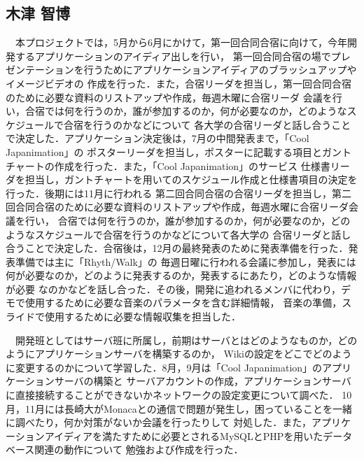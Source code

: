 \subsection{木津 智博}
\par
　本プロジェクトでは，5月から6月にかけて，第一回合同合宿に向けて，今年開発するアプリケーションのアイディア出しを行い，
第一回合同合宿の場でプレゼンテーションを行うためにアプリケーションアイディアのブラッシュアップやイメージビデオの
作成を行った．また，合宿リーダを担当し，第一回合同合宿のために必要な資料のリストアップや作成，毎週木曜に合宿リーダ
会議を行い，合宿では何を行うのか，誰が参加するのか，何が必要なのか，どのようなスケジュールで合宿を行うのかなどについて
各大学の合宿リーダと話し合うことで決定した．アプリケーション決定後は，7月の中間発表まで，「Cool Japanimation」の
ポスターリーダを担当し，ポスターに記載する項目とガントチャートの作成を行った．また，「Cool Japanimation」のサービス
仕様書リーダを担当し，ガントチャートを用いてのスケジュール作成と仕様書項目の決定を行った．後期には11月に行われる
第二回合同合宿の合宿リーダを担当し，第二回合同合宿のために必要な資料のリストアップや作成，毎週水曜に合宿リーダ会議を行い，
合宿では何を行うのか，誰が参加するのか，何が必要なのか，どのようなスケジュールで合宿を行うのかなどについて各大学の
合宿リーダと話し合うことで決定した．合宿後は，12月の最終発表のために発表準備を行った．発表準備では主に「Rhyth/Walk」の
毎週日曜に行われる会議に参加し，発表には何が必要なのか，どのように発表するのか，発表するにあたり，どのような情報が必要
なのかなどを話し合った．その後，開発に追われるメンバに代わり，デモで使用するために必要な音楽のパラメータを含む詳細情報，
音楽の準備，スライドで使用するために必要な情報収集を担当した．
\par
　開発班としてはサーバ班に所属し，前期はサーバとはどのようなものか，どのようにアプリケーションサーバを構築するのか，
Wikiの設定をどこでどのように変更するのかについて学習した．8月，9月は「Cool Japanimation」のアプリケーションサーバの構築と
サーバアカウントの作成，アプリケーションサーバに直接接続することができないかネットワークの設定変更について調べた．
10月，11月には長崎大がMonacaとの通信で問題が発生し，困っていることを一緒に調べたり，何か対策がないか会議を行ったりして
対処した．また，アプリケーションアイディアを満たすために必要とされるMySQLとPHPを用いたデータベース関連の動作について
勉強および作成を行った．
\par

